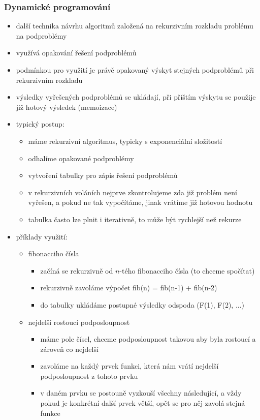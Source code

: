 \subsubsection*{Dynamické programování}
\begin{itemize}
	\item další technika návrhu algoritmů založená na rekurzivním rozkladu problému na podproblémy
	\item využívá opakování řešení podproblémů
	\item podmínkou pro využití je právě opakovaný výskyt stejných podproblémů při rekurzivním rozkladu
	\item výsledky vyřešených podproblémů se ukládají, při příštím výskytu se použije již hotový výsledek (memoizace)
	\item typický postup:
	\begin{itemize}
		\item máme rekurzivní algoritmus, typicky s exponenciální složitostí
		\item odhalíme opakované podproblémy
		\item vytvoření tabulky pro zápis řešení podproblémů
		\item v rekurzivních voláních nejprve zkontrolujeme zda již problém není vyřešen, a pokud ne tak vy\-po\-čí\-tá\-me, jinak vrátíme již hotovou hodnotu
		\item tabulka často lze plnit i iterativně, to může být rychlejší než rekurze
	\end{itemize}
	\item příklady využití:
	\begin{itemize}
		\item fibonacciho čísla
		\begin{itemize}
			\item začíná se rekurzivně od $n$-tého fibonacciho čísla (to chceme spočítat)
			\item rekurzivně zavoláme výpočet fib(n) = fib(n-1) + fib(n-2)
			\item do tabulky ukládáme postupné výsledky odspoda (F(1), F(2), ...)
		\end{itemize}
		\item nejdelší rostoucí podposloupnost
		\begin{itemize}
			\item máme pole čísel, chceme podposloupnost takovou aby byla rostoucí a zároveň co nejdelší
			\item zavoláme na každý prvek funkci, která nám vrátí nejdelší podposloupnost z tohoto prvku
			\item v daném prvku se postouně vyzkouší všechny následující, a vždy pokud je konkrétní další prvek větší, opět se pro něj zavolá stejná funkce

\end{itemize}
\end{itemize}
\end{itemize}
